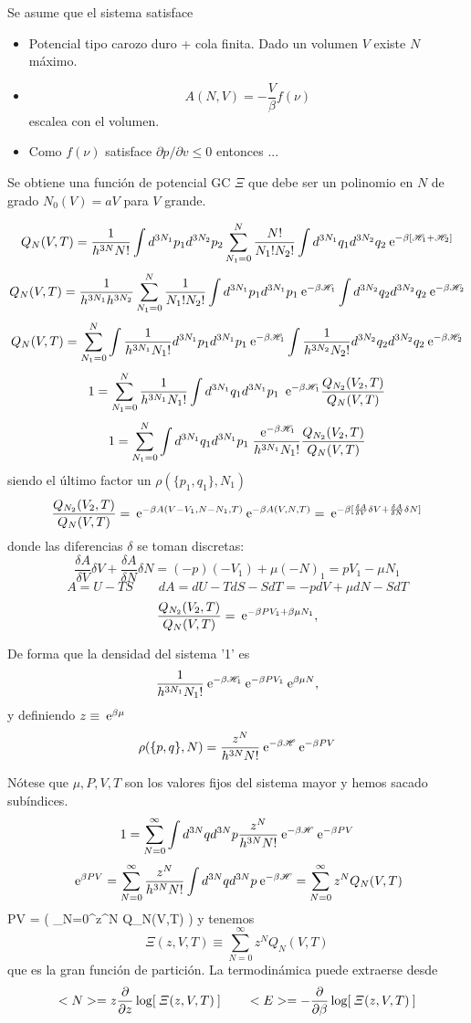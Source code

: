 \documentclass[10pt,oneside]{CBFT_book}
\begin{document}
Se asume que el sistema satisface
\begin{itemize}
 \item Potencial tipo carozo duro + cola finita. Dado un volumen $V$ existe $N$ máximo.
 \item \[
	A(N,V) = - \frac{V}{\beta} f(\nu)
 \]
 escalea con el volumen.
 \item Como $f(\nu)$ satisface $ \partial p / \partial v \leq 0$ entonces ...
\end{itemize}

Se obtiene una función de potencial GC $\Xi$ que debe ser un polinomio en $N$ de grado 
$N_0(V) = a V$ para $V$ grande.


\[
	Q_N (V,T) =  \frac{1}{h^{3N}N!} \int d^{3N_1}p_1 d^{3N_2}p_2  \sum_{N_1=0}^N \frac{N!}{N_1! N_2!}
	\int d^{3N_1}q_1 d^{3N_2}q_2 \:\mathrm{e}^{-\beta [\mathscr{H}_1 + \mathscr{H}_2 ]}
\]
\[
	Q_N (V,T) =  \frac{1}{h^{3N_1} h^{3N_2} } \sum_{N_1=0}^N \frac{1}{N_1! N_2!}
	\int d^{3N_1}p_1 d^{3N_1}p_1 \:\mathrm{e}^{-\beta\mathscr{H}_1} \int d^{3N_2}q_2 d^{3N_2}q_2 \:\mathrm{e}^{-\beta\mathscr{H}_2}
\]
\[
	Q_N (V,T) =  \sum_{N_1=0}^N \int \frac{1}{h^{3N_1}N_1!} d^{3N_1}p_1 d^{3N_1}p_1 \:\mathrm{e}^{-\beta \mathscr{H}_1 }
	\int \frac{1}{h^{3N_2}N_2!} d^{3N_2}q_2 d^{3N_2}q_2 \:\mathrm{e}^{-\beta \mathscr{H}_2 }
\]
\[
	1 = 
	\sum_{N_1=0}^N \frac{1}{h^{3N_1}N_1!} \int d^{3N_1}q_1 d^{3N_1}p_1 \; 
	\:\mathrm{e}^{-\beta\mathscr{H}_1} \frac{Q_{N_2}(V_2,T)}{Q_N(V,T)} 
\]
\[
	1 = 
	\sum_{N_1=0}^N \int d^{3N_1}q_1 d^{3N_1}p_1 \; \frac{\:\mathrm{e}^{-\beta\mathscr{H}_1}}{h^{3N_1}N_1!} 
	\frac{Q_{N_2}(V_2,T)}{Q_N(V,T)} 
\]
siendo el último factor un $ \rho(\{ p_1,q_1\},N_1)$
\[
	\frac{Q_{N_2}(V_2,T)}{Q_N(V,T)} = \:\mathrm{e}^{-\beta A (V-V_1,N-N_1,T)}\:\mathrm{e}^{-\beta A (V,N,T)} =
	\:\mathrm{e}^{-\beta [ \frac{\delta A}{\delta V} \delta V + \frac{\delta A}{\delta N} \delta N ] }
\]
donde las diferencias $\delta$ se toman discretas:
\[
	\frac{\delta A}{\delta V} \delta V + \frac{\delta A}{\delta N} \delta N =
	(-p )(-V_1) + \mu (-N)_1 = pV_1 - \mu N_1
\]
\[
	A = U - TS \qquad dA = dU - TdS - SdT = -pdV + \mu dN - SdT
\]
\[
	\frac{Q_{N_2}(V_2,T)}{Q_N(V,T)} = \:\mathrm{e}^{-\beta PV_1 + \beta \mu N_1},
\]

De forma que la densidad del sistema '1' es
\[
	\frac{1}{h^{3N_1}N_1!} \:\mathrm{e}^{-\beta\mathscr{H}_1}  \:\mathrm{e}^{-\beta PV_1}  \:\mathrm{e}^{\beta \mu N},
\]
y definiendo $z \equiv \:\mathrm{e}^{\beta\mu}$
\[
	\rho(\{p,q\},N) = \frac{z^N}{h^{3N}N!} \:\mathrm{e}^{-\beta\mathscr{H}}  \:\mathrm{e}^{-\beta PV} 
\]

Nótese que $ \mu, P, V, T$  son los valores fijos del sistema mayor y hemos sacado subíndices.
\[
	1 = \sum_{N=0}^\infty \int d^{3N}q d^{3N}p \frac{z^N}{h^{3N}N!} \:\mathrm{e}^{-\beta\mathscr{H}}  \:\mathrm{e}^{-\beta PV} 
\]
\[
	\:\mathrm{e}^{\beta PV} = \sum_{N=0}^\infty \frac{z^N}{h^{3N}N!} \int d^{3N}q d^{3N}p \:\mathrm{e}^{-\beta\mathscr{H}}
	= \sum_{N=0}^\infty z^N Q_N(V,T)
\]
\be
	\beta PV = \log \left( \sum_{N=0}^\infty z^N Q_N(V,T) \right)
	\label{betaPV}
\ee
y tenemos 
\[
	\Xi(z,V,T) \equiv \sum_{N=0}^\infty z^N Q_N(V,T)
\]
que es la gran función de partición.
La termodinámica puede extraerse desde 
\[
	<N> = z\frac{\partial^{\hspace{-0.05em}} {}}{\partial {z}^{\hspace{-0.05em}}} \log [ \:\Xi(z,V,T) \:]     \qquad 
	<E> = -\frac{\partial^{\hspace{-0.05em}} {}}{\partial {\beta}^{\hspace{-0.05em}}} \log [ \:\Xi(z,V,T)\: ]
\]
\end{document}

